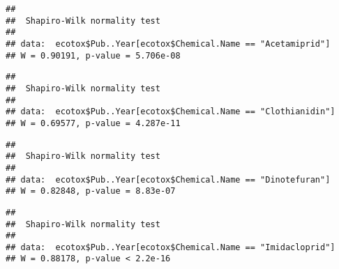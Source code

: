 \documentclass[]{article}
\newenvironment{Shaded}{\begin{snugshade}}{\end{snugshade}}
\newcommand{\KeywordTok}[1]{\textcolor[rgb]{0.13,0.29,0.53}{\textbf{#1}}}
\newcommand{\StringTok}[1]{\textcolor[rgb]{0.31,0.60,0.02}{#1}}
\newcommand{\OperatorTok}[1]{\textcolor[rgb]{0.81,0.36,0.00}{\textbf{#1}}}
\newcommand{\NormalTok}[1]{#1}
\begin{document}
\begin{verbatim}
## 
##  Shapiro-Wilk normality test
## 
## data:  ecotox$Pub..Year[ecotox$Chemical.Name == "Acetamiprid"]
## W = 0.90191, p-value = 5.706e-08
\end{verbatim}

\begin{Shaded}
\end{Shaded}

\begin{verbatim}
## 
##  Shapiro-Wilk normality test
## 
## data:  ecotox$Pub..Year[ecotox$Chemical.Name == "Clothianidin"]
## W = 0.69577, p-value = 4.287e-11
\end{verbatim}

\begin{Shaded}
\end{Shaded}

\begin{verbatim}
## 
##  Shapiro-Wilk normality test
## 
## data:  ecotox$Pub..Year[ecotox$Chemical.Name == "Dinotefuran"]
## W = 0.82848, p-value = 8.83e-07
\end{verbatim}

\begin{Shaded}
\end{Shaded}

\begin{verbatim}
## 
##  Shapiro-Wilk normality test
## 
## data:  ecotox$Pub..Year[ecotox$Chemical.Name == "Imidacloprid"]
## W = 0.88178, p-value < 2.2e-16
\end{verbatim}

\begin{Shaded}
\end{Shaded}
\end{document}
